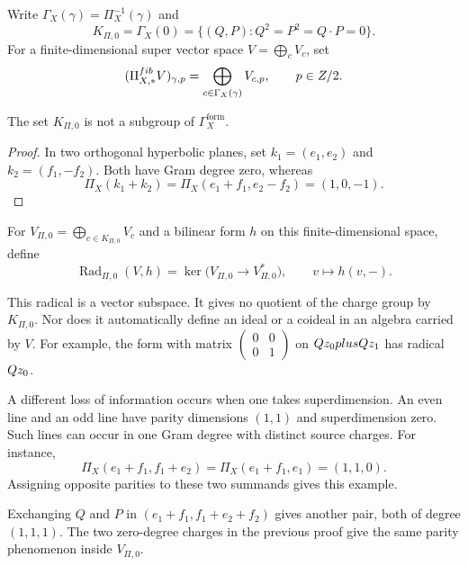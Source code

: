\begin{definition}
\label{def:gram-fibres-zero-fibre}
Write $\Gamma_X(\gamma)=\Pi_X^{-1}(\gamma)$ and
\[
K_{\Pi,0}=\Gamma_X(0)=\{(Q,P):Q^2=P^2=Q\cdot P=0\}.
\]
For a finite-dimensional super vector space $V=\bigoplus_cV_c$, set
\[
(\Pi_{X,*}^{fib}V)_{\gamma,p}
=\bigoplus_{c\in\Gamma_X(\gamma)}V_{c,p},
\qquad p\in Z/2.
\]
\end{definition}

\begin{proposition}
\label{prop:zero-gram-fibre-not-subgroup}
The set $K_{\Pi,0}$ is not a subgroup of
$\Gamma_X^{\mathrm{form}}$.
\end{proposition}

\begin{proof}
In two orthogonal hyperbolic planes, set
$k_1=(e_1,e_2)$ and $k_2=(f_1,-f_2)$.  Both have Gram degree zero,
whereas
\[
\Pi_X(k_1+k_2)=\Pi_X(e_1+f_1,e_2-f_2)=(1,0,-1).
\]
\end{proof}

\begin{definition}
\label{def:zero-fibre-radical-finite-source}
For $V_{\Pi,0}=\bigoplus_{c\in K_{\Pi,0}}V_c$ and a bilinear form
$h$ on this finite-dimensional space, define
\[
\operatorname{Rad}_{\Pi,0}(V,h)
=\ker\bigl(V_{\Pi,0}\longrightarrow V_{\Pi,0}^*\bigr),
\qquad v\longmapsto h(v,-).
\]
\end{definition}

\begin{remark}
\label{rem:fibre-summation-not-radical}
This radical is a vector subspace.  It gives no quotient of the charge
group by $K_{\Pi,0}$.  Nor does it automatically define an ideal or a
coideal in an algebra carried by $V$.  For example, the form with
matrix $\left(\begin{smallmatrix}0&0\\0&1\end{smallmatrix}\right)$
on $Q z_0plusQ z_1$ has radical $Q z_0$.

A different loss of information occurs when one takes superdimension.
An even line and an odd line have parity dimensions $(1,1)$ and
superdimension zero.  Such lines can occur in one Gram degree with
distinct source charges.  For instance,
\[
\Pi_X(e_1+f_1,f_1+e_2)=\Pi_X(e_1+f_1,e_1)=(1,1,0).
\]
Assigning opposite parities to these two summands gives this example.

Exchanging $Q$ and $P$ in
$(e_1+f_1,f_1+e_2+f_2)$ gives another pair, both of degree $(1,1,1)$.
The two zero-degree charges in the previous proof give the same
parity phenomenon inside $V_{\Pi,0}$.
\end{remark}

